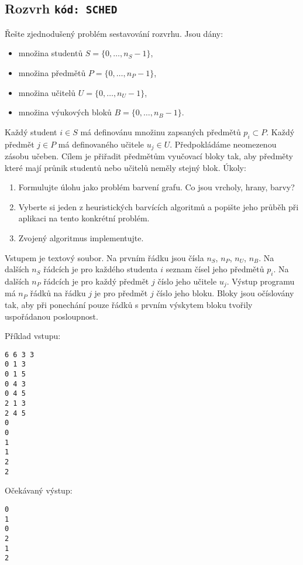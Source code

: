 \documentclass[a4paper,10pt]{article}
\begin{document}
\subsection{Rozvrh \hfill{\tt kód: SCHED}}
Řešte zjednodušený problém sestavování rozvrhu. Jsou dány:
\begin{itemize}
 \item množina studentů $S=\{0,\dots, n_S - 1\}$, 
 \item množina předmětů $P=\{0,\dots, n_P - 1\}$,
 \item množina učitelů  $U=\{0,\dots, n_U - 1\}$, 
 \item množina výukových bloků $B=\{0,\dots, n_B - 1\}$. 
\end{itemize}
Každý student $i\in S$ má definovánu množinu zapsaných předmětů $p_i \subset P$. 
Každý předmět $j\in P$ má definovaného učitele $u_j \in U$. Předpokládáme neomezenou zásobu učeben.
Cílem je přiřadit předmětům vyučovací bloky tak, aby předměty které mají průnik studentů nebo učitelů
neměly stejný blok.
Úkoly:
\begin{enumerate} 
 \item Formulujte úlohu jako problém barvení grafu. Co jsou vrcholy, hrany, barvy?
 \item Vyberte si jeden z heuristických barvících algoritmů a popište jeho průběh při aplikaci na tento konkrétní problém.
 \item Zvojený algoritmus implementujte.
\end{enumerate}

Vstupem je textový soubor. Na prvním řádku jsou čísla $n_S$, $n_P$, $n_U$, $n_B$.
Na dalších $n_S$ řádcích je pro každého studenta $i$ seznam čísel jeho předmětů $p_i$. 
Na dalších $n_P$ řádcích je pro každý předmět $j$ číslo jeho učitele $u_j$.
Výstup programu má $n_P$ řádků na řádku $j$ je pro předmět $j$ číslo jeho bloku. 
Bloky jsou očíslovány tak, aby při ponechání pouze řádků s prvním výskytem bloku
tvořily uspořádanou posloupnost.

Příklad vstupu:
\begin{verbatim}
6 6 3 3
0 1 3
0 1 5
0 4 3
0 4 5
2 1 3
2 4 5
0
0
1
1
2
2
\end{verbatim}

Očekávaný výstup:
\begin{verbatim}
0
1
0
2
1
2
\end{verbatim}
\end{document}
